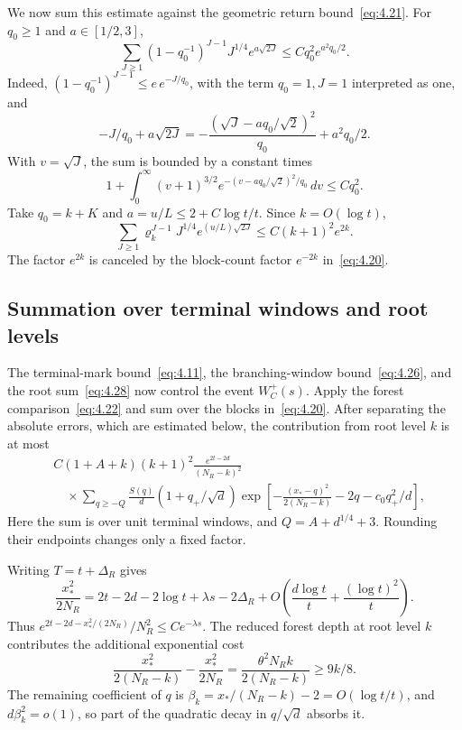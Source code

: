 \documentclass[11pt,a4paper]{article}
\numberwithin{equation}{section}
\theoremstyle{remark}
\begin{document}
We now sum this estimate against the geometric return bound~\eqref{eq:4.21}. For $q_0\ge1$ and $a\in[1/2,3]$,
\begin{equation}\label{eq:4.27}
\sum_{J\ge1}(1-q_0^{-1})^{J-1}J^{1/4}e^{a\sqrt{2J}}
\le Cq_0^2e^{a^2q_0/2}.
\end{equation}
Indeed, $(1-q_0^{-1})^{J-1}\le e\,e^{-J/q_0}$, with the term $q_0=1,J=1$ interpreted as one, and
\[
-J/q_0+a\sqrt{2J}
=-\frac{(\sqrt J-aq_0/\sqrt2)^2}{q_0}+a^2q_0/2.
\]
With $v=\sqrt J$, the sum is bounded by a constant times
\[
1+\int_0^\infty (v+1)^{3/2}
 e^{-(v-aq_0/\sqrt2)^2/q_0}\,dv\le Cq_0^2.
\]
Take $q_0=k+K$ and $a=u/L\le2+C\log t/t$. Since $k=O(\log t)$,
\begin{equation}\label{eq:4.28}
\sum_{J\ge1}\varrho_k^{J-1}J^{1/4}e^{(u/L)\sqrt{2J}}
\le C(k+1)^2e^{2k}.
\end{equation}
The factor $e^{2k}$ is canceled by the block-count factor $e^{-2k}$ in~\eqref{eq:4.20}.

\subsection{Summation over terminal windows and root levels}\label{sec:uppersum}
The terminal-mark bound~\eqref{eq:4.11}, the branching-window bound~\eqref{eq:4.26}, and the root sum~\eqref{eq:4.28} now control the event $W_C^+(s)$. Apply the forest comparison~\eqref{eq:4.22} and sum over the blocks in~\eqref{eq:4.20}. After separating the absolute errors, which are estimated below, the contribution from root level $k$ is at most
\begin{equation}\label{eq:4.29}
\begin{split}
&C(1+A+k)(k+1)^2\frac{e^{2t-2d}}{(N_R-k)^2}\\
&\quad\times\sum_{q\ge-Q}\frac{S(q)}d
(1+q_+/\sqrt d)
\exp\left[-\frac{(x_*-q)^2}{2(N_R-k)}-2q-c_0q_+^2/d\right],
\end{split}
\end{equation}
Here the sum is over unit terminal windows, and $Q=A+d^{1/4}+3$. Rounding their endpoints changes only a fixed factor.

Writing $T=t+\Delta_R$ gives
\begin{equation}\label{eq:4.30}
\frac{x_*^2}{2N_R}
=2t-2d-2\log t+\lambda s-2\Delta_R
+O\left(\frac{d\log t}{t}+\frac{(\log t)^2}{t}\right).
\end{equation}
Thus $e^{2t-2d-x_*^2/(2N_R)}/N_R^2\le Ce^{-\lambda s}$. The reduced forest depth at root level $k$ contributes the additional exponential cost
\begin{equation}\label{eq:4.31}
\frac{x_*^2}{2(N_R-k)}-\frac{x_*^2}{2N_R}
=\frac{\theta^2 N_R k}{2(N_R-k)}\ge9k/8.
\end{equation}
The remaining coefficient of $q$ is
$\beta_k=x_* /(N_R-k)-2=O(\log t/t)$, and $d\beta_k^2=o(1)$, so part of the quadratic decay in $q/\sqrt d$ absorbs it.
\end{document}

